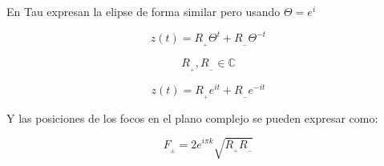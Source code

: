 \documentclass[preview]{standalone}
\begin{document}
\begin{center}
En Tau expresan la elipse de forma similar pero usando $\Theta=e^i$

$$z(t)=R_{_+} \Theta^{t} +R_{_-} \Theta^{-t}$$ 

$$ R_{_+} , R_{_-} \in \mathbb{C}$$  

$$z(t)=R_{_+} e^{it} +R_{_-} e^{-it}$$ 



Y las posiciones de los focos en el plano complejo se pueden expresar como:

$$F_{_{\pm}}=2 e^{i\pi k} \sqrt{R_{_+}R_{_-}}$$
\end{center}
\end{document}
